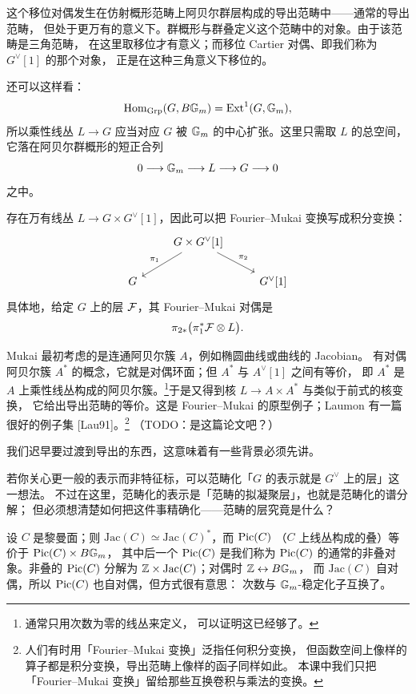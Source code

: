 \begin{remark}
这个移位对偶发生在仿射概形范畴上阿贝尔群层构成的导出范畴中——通常的导出范畴，
但处于更万有的意义下。群概形与群叠定义这个范畴中的对象。由于该范畴是三角范畴，
在这里取移位才有意义；而移位 Cartier 对偶、即我们称为 $G^\vee[1]$ 的那个对象，
正是在这种三角意义下移位的。
\end{remark}

还可以这样看：
\[
\operatorname{Hom}_{\mathrm{Grp}}(G,B\mathbb{G}_m)=\operatorname{Ext}^1(G,\mathbb{G}_m),
\]
所以乘性线丛 $L\to G$ 应当对应 $G$ 被 $\mathbb{G}_m$ 的中心扩张。这里只需取 $L$ 的总空间，
它落在阿贝尔群概形的短正合列
\[
0\longrightarrow \mathbb{G}_m\longrightarrow L\longrightarrow G\longrightarrow 0
\]
之中。

存在万有线丛 $L\to G\times G^\vee[1]$，因此可以把 Fourier–Mukai 变换写成积分变换：
\[
\begin{tikzcd}
& G\times G^\vee[1] \arrow[dl,"\pi_1"'] \arrow[dr,"\pi_2"] & \\
G & & G^\vee[1]
\end{tikzcd}
\]
具体地，给定 $G$ 上的层 $\mathcal{F}$，其 Fourier–Mukai 对偶是
\[
\pi_{2*}\bigl(\pi_1^*\mathcal{F}\otimes L\bigr).
\]

Mukai 最初考虑的是连通阿贝尔簇 $A$，例如椭圆曲线或曲线的 Jacobian。
有对偶阿贝尔簇 $A^*$ 的概念，它就是对偶环面；但 $A^*$ 与 $A^\vee[1]$ 之间有等价，
即 $A^*$ 是 $A$ 上乘性线丛构成的阿贝尔簇。\footnote{通常只用次数为零的线丛来定义，
可以证明这已经够了。}于是又得到核 $L\to A\times A^*$ 与类似于前式的核变换，
它给出导出范畴的等价。这是 Fourier–Mukai 的原型例子；Laumon 有一篇很好的例子集
[Lau91]。\footnote{人们有时用「Fourier–Mukai 变换」泛指任何积分变换，
但函数空间上像样的算子都是积分变换，导出范畴上像样的函子同样如此。
本课中我们只把「Fourier–Mukai 变换」留给那些互换卷积与乘法的变换。}
（TODO：是这篇论文吧？）

我们迟早要过渡到导出的东西，这意味着有一些背景必须先讲。

\begin{remark}
若你关心更一般的表示而非特征标，可以范畴化「$G$ 的表示就是 $G^\vee$ 上的层」这一想法。
不过在这里，范畴化的表示是「范畴的拟凝聚层」，也就是范畴化的谱分解；
但必须想清楚如何把这件事精确化——范畴的层究竟是什么？
\end{remark}

设 $C$ 是黎曼面；则 $\mathrm{Jac}(C)\simeq\mathrm{Jac}(C)^*$，而 $\operatorname{Pic}(C)$
（$C$ 上线丛构成的叠）等价于 $\operatorname{Pic}(C)\times B\mathbb{G}_m$，
其中后一个 $\operatorname{Pic}(C)$ 是我们称为 $\operatorname{Pic}(C)$ 的通常的非叠对象。非叠的 $\operatorname{Pic}(C)$
分解为 $\mathbb{Z}\times\mathrm{Jac}(C)$；对偶时 $\mathbb{Z}\leftrightarrow B\mathbb{G}_m$，
而 $\mathrm{Jac}(C)$ 自对偶，所以 $\operatorname{Pic}(C)$ 也自对偶，但方式很有意思：
次数与 $\mathbb{G}_m$-稳定化子互换了。

